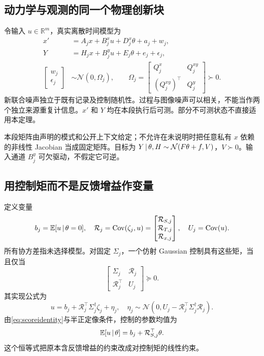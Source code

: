 \documentclass[UTF8,fontset=fandol,zihao=5,a4paper]{ctexart}
\newcommand{\R}{\mathbb R}\newcommand{\N}{\mathcal N}
\newcommand{\E}{\mathbb E}\newcommand{\Pp}{\mathbb P}
\DeclareMathOperator{\Cov}{Cov}\DeclareMathOperator{\im}{im}
\theoremstyle{definition}
\theoremstyle{remark}\newtheorem{remark}[theorem]{说明}
\numberwithin{equation}{section}
\begin{document}
\subsection{动力学与观测的同一个物理创新块}
令输入 $u\in\R^m$，真实离散时间模型为
\begin{align}
x'&=A_jx+B_j^xu+D_j^x\theta+a_j+w_j,\\
Y&=H_jx+B_j^yu+E_j\theta+e_j+\epsilon_j,
\label{eq:statephysical}\\
\begin{bmatrix}w_j\\\epsilon_j\end{bmatrix}
&\sim\N(0,\Omega_j),\qquad
\Omega_j=\begin{bmatrix}Q_j^x&Q_j^{xy}\\(Q_j^{xy})^\top&Q_j^y\end{bmatrix}\succ0.
\label{eq:jointnoise}
\end{align}
新联合噪声独立于既有记录及控制随机性。过程与图像噪声可以相关，不能当作两个独立来源重复计信息。$x'$ 和 $Y$ 均在本段执行后可测。部分不可测状态不直接适用本定理。

本段矩阵由声明的模式和公开上下文给定；不允许在未说明时把任意私有 $x$ 依赖的非线性 Jacobian 当成固定矩阵。目标为 $Y\given\theta,H\sim\N(F\theta+f,V)$，$V\succ0$。输入通道 $B_j^y$ 可欠驱动，不假定它可逆。

\subsection{用控制矩而不是反馈增益作变量}
定义变量
\begin{equation}
b_j=\E[u\given\theta=0],\quad
\mathcal R_j=\Cov(\zeta_j,u)
=\begin{bmatrix}\mathcal R_{S,j}\\\mathcal R_{T,j}\\\mathcal R_{x,j}\end{bmatrix},
\quad U_j=\Cov(u).
\end{equation}
所有协方差指未选择模型。对固定 $\Sigma_j$，一个仿射 Gaussian 控制具有这些矩，当且仅当
\begin{equation}
\boxed{\begin{bmatrix}\Sigma_j&\mathcal R_j\\\mathcal R_j^\top&U_j\end{bmatrix}\succeq0.}
\label{eq:momentLMI}
\end{equation}
其实现公式为
\begin{equation}
\boxed{u=b_j+\mathcal R_j^\top\Sigma_j^\dagger\zeta_j+\eta_j,\quad
\eta_j\sim\N(0,U_j-\mathcal R_j^\top\Sigma_j^\dagger\mathcal R_j).}
\label{eq:statecontrol}
\end{equation}
由\eqref{eq:scoreidentity}与半正定像条件，控制的参数均值为
\begin{equation}
\E[u\given\theta]=b_j+\mathcal R_{S,j}^\top\theta.
\label{eq:controlmean}
\end{equation}
这个恒等式把原本含反馈增益的约束改成对控制矩的线性约束。
\end{document}
